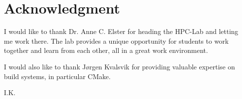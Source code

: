 \section*{Acknowledgment}
I would like to thank Dr. Anne C. Elster for heading the HPC-Lab and letting me work there. The lab provides a unique opportunity for students to work together and learn from each other, all in a great work environment.

I would also like to thank Jørgen Kvalsvik for providing valuable expertise on build systems, in particular CMake.
\begin{flushright}
I.K.\\[1pc]
\end{flushright}